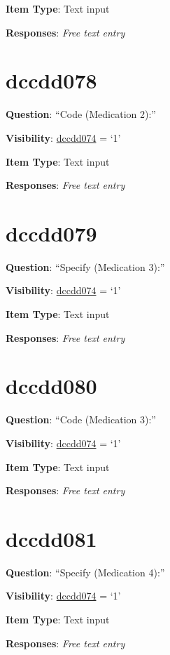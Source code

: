 \documentclass[]{book}
\begin{document}
\textbf{Item Type}: Text input

\textbf{Responses}: \emph{Free text entry}

\hypertarget{dccdd078}{%
\section{dccdd078}\label{dccdd078}}

\textbf{Question}: ``Code (Medication 2):''

\textbf{Visibility}: \protect\hyperlink{dccdd074}{dccdd074} = `1'

\textbf{Item Type}: Text input

\textbf{Responses}: \emph{Free text entry}

\hypertarget{dccdd079}{%
\section{dccdd079}\label{dccdd079}}

\textbf{Question}: ``Specify (Medication 3):''

\textbf{Visibility}: \protect\hyperlink{dccdd074}{dccdd074} = `1'

\textbf{Item Type}: Text input

\textbf{Responses}: \emph{Free text entry}

\hypertarget{dccdd080}{%
\section{dccdd080}\label{dccdd080}}

\textbf{Question}: ``Code (Medication 3):''

\textbf{Visibility}: \protect\hyperlink{dccdd074}{dccdd074} = `1'

\textbf{Item Type}: Text input

\textbf{Responses}: \emph{Free text entry}

\hypertarget{dccdd081}{%
\section{dccdd081}\label{dccdd081}}

\textbf{Question}: ``Specify (Medication 4):''

\textbf{Visibility}: \protect\hyperlink{dccdd074}{dccdd074} = `1'

\textbf{Item Type}: Text input

\textbf{Responses}: \emph{Free text entry}
\end{document}
